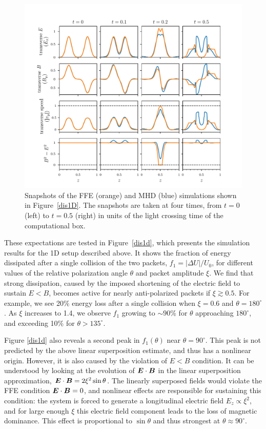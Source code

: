 \begin{figure}[h]
\centering
\includegraphics[width=\textwidth]{pics/chap4/snapshots}
\caption[Snapshots of the FFE and MHD simulations]{
Snapshots of the FFE (orange) and MHD (blue) simulations shown in Figure~\ref{dis1D}. 
The snapshots are taken at four times, from $t=0$ (left) to $t=0.5$ (right) in units of the light crossing time of the computational box. 
}
\label{snapshots}
\end{figure}

These expectations are tested in Figure~\ref{dis1d}, which presents the simulation results for the 1D setup described above. It shows the fraction of energy dissipated after a single collision of the two packets, $f_1=|\Delta U|/U_0$, for different values of the relative polarization angle $\theta$ and packet amplitude $\xi$. We find that strong dissipation, caused by the imposed shortening of the electric field to sustain $E<B$, becomes active for nearly anti-polarized packets if $\xi \gtrsim 0.5$. For example, we see 20\% energy loss after a single collision when $\xi = 0.6$ and $\theta = 180^\circ$. As $\xi$ increases to 1.4, we observe $f_1$ growing to $\sim 90$\% for $\theta$ approaching $180^\circ$, and exceeding 10\% for $\theta>135^\circ$.
 
Figure \ref{dis1d} also reveals a second peak in $f_1(\theta)$ near $\theta=90^\circ$. This peak is not predicted by the above linear superposition estimate, and thus has a nonlinear origin. However, it is also caused by the violation of $E<B$ condition.
It can be understood by looking at the evolution of $\boldsymbol{E}\cdot \boldsymbol{B}$ in the linear superposition approximation, $\boldsymbol{E}\cdot \boldsymbol{B} = 2\xi^2\sin\theta$. 
The linearly superposed fields would violate the FFE condition $\boldsymbol{E}\cdot \boldsymbol{B}=0$, and nonlinear effects are responsible for sustaining this condition: the system is forced to generate a longitudinal electric field $E_z \propto \xi^2$, and for large enough $\xi$ this electric field component leads to the loss of magnetic dominance. 
This effect is proportional to $\sin\theta$ and thus strongest at $\theta\approx 90^\circ$.


